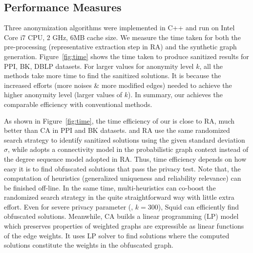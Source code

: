 \subsection{Performance Measures}
Three anonymization algorithms were implemented in C++ and run on Intel Core i7 CPU, 2 GHz, 6MB cache size. We measure the time taken for both the pre-processing (representative extraction step in RA) and the synthetic graph generation. 
Figure~\ref{fig:time} shows the time taken to produce sanitized results for PPI, BK, DBLP datasets. 
For larger values for anonymity level $k$, all the methods take more time to find the sanitized solutions. It is because the increased efforts (more noises \& more modified edges) needed to achieve the higher anonymity level (larger values of $k$). 
In summary, our {\methodName} achieves the comparable efficiency with conventional methods.

As shown in Figure~\ref{fig:time}, the time efficiency of our {\methodName} is close to RA, much better than CA in PPI and BK datasets. 
{\methodName} and RA use the same randomized search strategy to identify sanitized solutions using the given standard deviation $\sigma$, while {\methodName} adopts a connectivity model in the probabilistic graph context instead of the degree sequence model adopted in RA. 
Thus, time efficiency depends on how easy it is to find obfuscated solutions that pass the privacy test.  
Note that, the computation of heuristics (generalized uniqueness and reliability relevance) can be finished off-line. 
In the same time, multi-heuristics can co-boost the randomized search strategy in the quite straightforward way with little extra effort. 
Even for severe privacy parameter ({\eg}, $k=300$), Squid can efficiently find obfuscated solutions. 
Meanwhile, CA builds a linear programming (LP) model which preserves properties of weighted graphs are expressible as linear functions of the edge weights. It uses LP solver to find solutions where the computed solutions constitute the weights in the obfuscated graph. 





